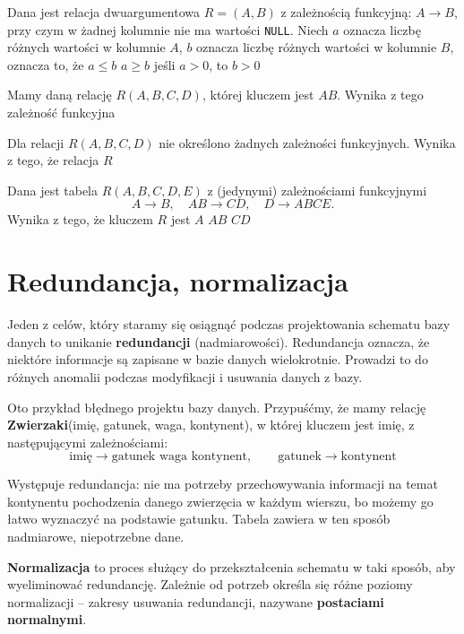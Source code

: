 \begin{problems}
    \prob Dana jest relacja dwuargumentowa $R = (A, B)$ z zależnością funkcyjną: $A \to B$, przy czym w żadnej kolumnie nie ma wartości \texttt{NULL}. Niech $a$ oznacza liczbę różnych wartości w kolumnie $A$, $b$ oznacza liczbę różnych wartości w kolumnie $B$, oznacza to, że
    \answers
    {$a \leq b$}
    {$a \geq b$}
    {jeśli $a>0$, to $b>0$}

    \prob Mamy daną relację $R(A,B,C,D)$, której kluczem jest $AB$. Wynika z tego zależność funkcyjna

    \prob Dla relacji $R(A,B,C,D)$ nie określono żadnych zależności funkcyjnych. Wynika z tego, że relacja $R$

    \prob Dana jest tabela $R(A, B, C, D, E)$ z (jedynymi) zależnościami funkcyjnymi $$A \rightarrow B, \quad AB \rightarrow CD, \quad D \rightarrow ABCE.$$ Wynika z tego, że kluczem $R$ jest
    \answers
    {$A$}
    {$AB$}
    {$CD$}
\end{problems}

\section{Redundancja, normalizacja}

Jeden z celów, który staramy się osiągnąć podczas projektowania schematu bazy danych to unikanie \textbf{redundancji} (nadmiarowości). Redundancja oznacza, że niektóre informacje są zapisane w bazie danych wielokrotnie. Prowadzi to do różnych anomalii podczas modyfikacji i usuwania danych z bazy.

\begin{example}
	Oto przykład błędnego projektu bazy danych. Przypuśćmy, że mamy relację \textbf{Zwierzaki}(imię, gatunek, waga, kontynent), w której kluczem jest imię, z następującymi zależnościami:
	$$\text{imię} \to \text{gatunek waga kontynent}, \qquad \text{gatunek} \to \text{kontynent}$$
	
	Występuje redundancja: nie ma potrzeby przechowywania informacji na temat kontynentu pochodzenia danego zwierzęcia w każdym wierszu, bo możemy go łatwo wyznaczyć na podstawie gatunku. Tabela zawiera w ten sposób nadmiarowe, niepotrzebne dane.
\end{example}

\textbf{Normalizacja} to proces służący do przekształcenia schematu w taki sposób, aby wyeliminować redundancję. Zależnie od potrzeb określa się różne poziomy normalizacji -- zakresy usuwania redundancji, nazywane \textbf{postaciami normalnymi}.

